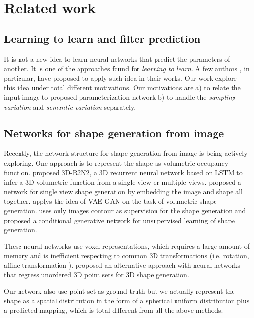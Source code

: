 \section{Related work}
\subsection{Learning to learn and filter prediction}
It is not a new idea to learn neural networks that predict the parameters of another. It is one of the approaches found for \textit{learning to learn}.  A few authors \citep{schmidhuber1992learning,bertinetto2016learning,jia2016dynamic} , in particular, have proposed to apply such idea in their works. Our work explore this idea under total different motivations. Our motivations are a) to relate the input image to proposed parameterization network b) to handle the \textit{sampling variation} and \textit{semantic variation} separately. 

\subsection{Networks for shape generation from image}
Recently, the network structure for shape generation from image is being actively exploring. One approach is to represent the shape as volumetric occupancy function. \citep{3DR2N2} proposed 3D-R2N2, a 3D recurrent neural network based on LSTM to infer a 3D volumetric function from a single view or multiple views. \citep{girdhar2016learning} proposed a network for single view shape generation by embedding the image and shape all together. \citep{NIPS2016_6096} applys the idea of VAE-GAN on the task of volumetric shape generation. \citep{NIPS2016_6206} uses only images contour as supervision for the shape generation and \citep{NIPS2016_6600} proposed a conditional generative network for unsupervised learning of shape generation. 

These neural networks use voxel representations, which
requires a large amount of memory and is inefficient respecting to common 3D transformations (i.e. rotation, affine transformation ). \citep{PSGN} proposed an alternative approach with neural networks that regress unordered
3D point sets for 3D shape generation. 

Our network also use point set as ground truth but we actually represent the shape as a spatial distribution in the form of a spherical uniform distribution plus a predicted mapping, which is total different from all the above methods. 

